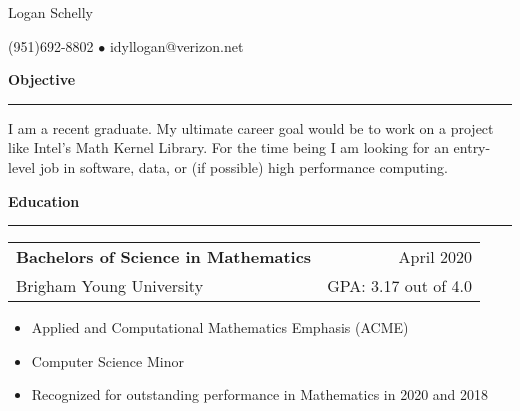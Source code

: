\documentclass{article}
\newcommand{\jobInfo}[4]{
  \begingroup
  \setlength{\tabcolsep}{0ex}
  \begin{tabularx}{\linewidth}{X r}
    #1 & %
    #2\\ %
    #3 & %
    #4   %
  \end{tabularx}%
  \endgroup%
}
\newcommand{\degree}[4]{
  \jobInfo{\textbf{#1}}{#2}{#3}{#4}
}
\begin{document}
\begin{center}
{\Large Logan Schelly} %

(951)\phantom{-}692-8802 %
$\bullet$ %
idyllogan@verizon.net %
\end{center}

\textbf{Objective}
\smallskip
\hrule
I am a recent graduate.
My ultimate career goal would be to work on a project like Intel's Math Kernel Library.
For the time being I am looking for an entry-level job in software, data, or (if possible) high performance computing.

\textbf{Education}
\smallskip
\hrule

\degree{Bachelors of Science in Mathematics}{April 2020}{Brigham Young University}{GPA: 3.17 out of 4.0}
%
\begin{itemize}[labelindent=2ex, itemsep=0ex, parsep=0ex, partopsep=0ex, topsep= -.7ex]%
  \item Applied and Computational Mathematics Emphasis (ACME)
  \item Computer Science Minor
  \item Recognized for outstanding performance in Mathematics in 2020 and 2018
\end{itemize}
\end{document}
